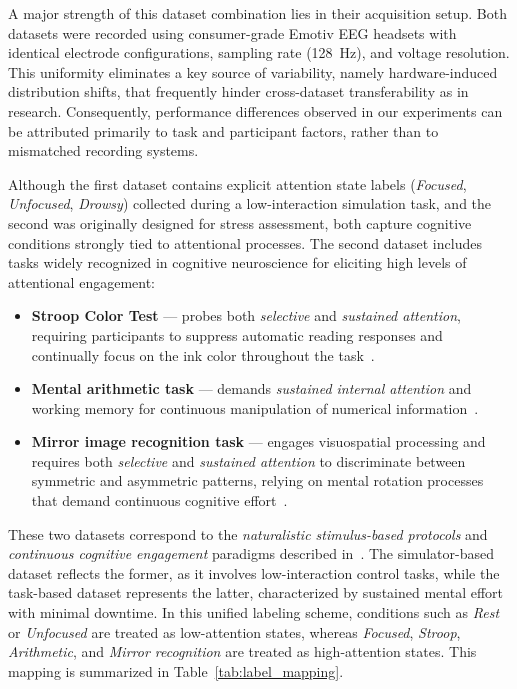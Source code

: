 \documentclass[utf8]{FrontiersinHarvard} %
\begin{document}
A major strength of this dataset combination lies in their acquisition setup. Both datasets were recorded using consumer-grade Emotiv EEG headsets with identical electrode configurations, sampling rate (128~Hz), and voltage resolution. This uniformity eliminates a key source of variability, namely hardware-induced distribution shifts, that frequently hinder cross-dataset transferability as in \cite{Lan2019DomainAdaptationEEG} research. Consequently, performance differences observed in our experiments can be attributed primarily to task and participant factors, rather than to mismatched recording systems.

Although the first dataset contains explicit attention state labels (\textit{Focused}, \textit{Unfocused}, \textit{Drowsy}) collected during a low-interaction simulation task, and the second was originally designed for stress assessment, both capture cognitive conditions strongly tied to attentional processes. The second dataset includes tasks widely recognized in cognitive neuroscience for eliciting high levels of attentional engagement:  
\begin{itemize}
    \item \textbf{Stroop Color Test} — probes both \textit{selective} and \textit{sustained attention}, requiring participants to suppress automatic reading responses and continually focus on the ink color throughout the task~\cite{macleod1991stroop, scarpina2017stroop, esterman2013neural}.
    \item \textbf{Mental arithmetic task} — demands \textit{sustained internal attention} and working memory for continuous manipulation of numerical information~\cite{grabner2007math, zhou2010eeg}.  
    \item \textbf{Mirror image recognition task} — engages visuospatial processing and requires both \textit{selective} and \textit{sustained attention} to discriminate between symmetric and asymmetric patterns, relying on mental rotation processes that demand continuous cognitive effort~\cite{shepard1971mental, hyun2007visual, voyer2011performance}.
\end{itemize}

These two datasets correspond to the \textit{naturalistic stimulus-based protocols} and \textit{continuous cognitive engagement} paradigms described in~\cite{chen2025hybrid}. The simulator-based dataset reflects the former, as it involves low-interaction control tasks, while the task-based dataset represents the latter, characterized by sustained mental effort with minimal downtime. In this unified labeling scheme, conditions such as \textit{Rest} or \textit{Unfocused} are treated as low-attention states, whereas \textit{Focused}, \textit{Stroop}, \textit{Arithmetic}, and \textit{Mirror recognition} are treated as high-attention states. This mapping is summarized in Table~\ref{tab:label_mapping}.
\end{document}
